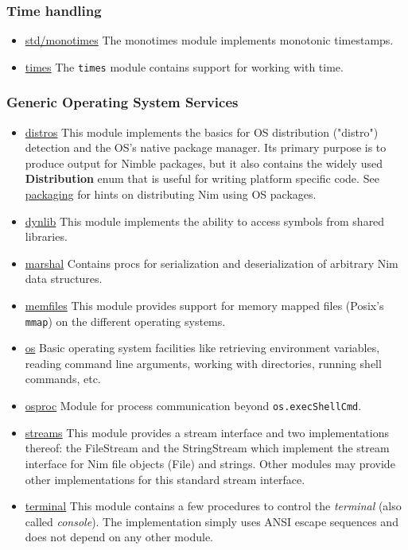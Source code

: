 \hypertarget{time-handling}{%
\subsubsection{Time handling}\label{time-handling}}

\begin{itemize}
\tightlist
\item
  \href{monotimes.html}{std/monotimes} The {monotimes} module implements
  monotonic timestamps.
\item
  \href{times.html}{times} The \texttt{times} module contains support
  for working with time.
\end{itemize}

\hypertarget{generic-operating-system-services}{%
\subsubsection{Generic Operating System
Services}\label{generic-operating-system-services}}

\begin{itemize}
\tightlist
\item
  \href{distros.html}{distros} This module implements the basics for OS
  distribution ("distro") detection and the OS's native package manager.
  Its primary purpose is to produce output for Nimble packages, but it
  also contains the widely used \textbf{Distribution} enum that is
  useful for writing platform specific code. See
  \href{packaging.html}{packaging} for hints on distributing Nim using
  OS packages.
\item
  \href{dynlib.html}{dynlib} This module implements the ability to
  access symbols from shared libraries.
\item
  \href{marshal.html}{marshal} Contains procs for serialization and
  deserialization of arbitrary Nim data structures.
\item
  \href{memfiles.html}{memfiles} This module provides support for memory
  mapped files (Posix's \texttt{mmap}) on the different operating
  systems.
\item
  \href{os.html}{os} Basic operating system facilities like retrieving
  environment variables, reading command line arguments, working with
  directories, running shell commands, etc.
\item
  \href{osproc.html}{osproc} Module for process communication beyond
  \texttt{os.execShellCmd}.
\item
  \href{streams.html}{streams} This module provides a stream interface
  and two implementations thereof: the {FileStream} and the
  {StringStream} which implement the stream interface for Nim file
  objects ({File}) and strings. Other modules may provide other
  implementations for this standard stream interface.
\item
  \href{terminal.html}{terminal} This module contains a few procedures
  to control the \emph{terminal} (also called \emph{console}). The
  implementation simply uses ANSI escape sequences and does not depend
  on any other module.
\end{itemize}

